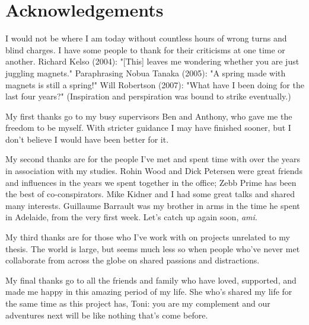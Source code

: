 
\chapter{Acknowledgements}

I would not be where I am today without countless hours of wrong turns and
blind charges. I have some people to thank for their criticisms at one time or
another. Richard Kelso (2004): "[This] leaves me wondering whether you are
just juggling magnets." Paraphrasing Nobua Tanaka (2005): "A spring made with
magnets is still a spring!" Will Robertson (2007): "What have I been doing for
the last four years?" (Inspiration and perspiration was bound to strike
eventually.)

My first thanks go to my busy supervisors Ben and Anthony, who gave me the
freedom to be myself. With stricter guidance I may have finished sooner, but I
don't believe I would have been better for it.

My second thanks are for the people I've met and spent time with over the
years in association with my studies. Rohin Wood and Dick Petersen were great
friends and influences in the years we spent together in the office; Zebb
Prime has been the best of co-conspirators. Mike Kidner and I had some great
talks and shared many interests. Guillaume Barrault was my brother in arms
in the time he spent in Adelaide, from the very first week. Let's catch up
again soon, \emph{ami}.

My third thanks are for those who I've work with on projects unrelated to my
thesis. The world is large, but seems much less so when people who've never
met collaborate from across the globe on shared passions and distractions.

My final thanks go to all the friends and family who have loved, supported,
and made me happy in this amazing period of my life. She who's shared my life
for the same time as this project has, Toni: you are my complement and our
adventures next will be like nothing that's come before.
